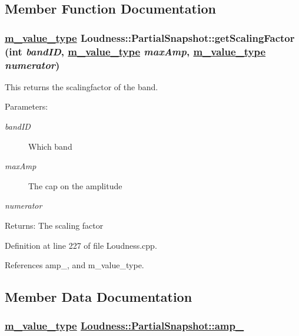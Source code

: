\subsection{Member Function Documentation}
\hypertarget{classLoudness_1_1PartialSnapshot_a1}{
\subsubsection[getScalingFactor]{\setlength{\rightskip}{0pt plus 5cm}\hyperlink{Types_8h_a3}{m\_\-value\_\-type} Loudness::Partial\-Snapshot::get\-Scaling\-Factor (int {\em band\-ID}, \hyperlink{Types_8h_a3}{m\_\-value\_\-type} {\em max\-Amp}, \hyperlink{Types_8h_a3}{m\_\-value\_\-type} {\em numerator})}}
\label{classLoudness_1_1PartialSnapshot_a1}


This returns the scalingfactor of the band. \begin{Desc}
\item[Parameters:]
\begin{description}
\item[{\em band\-ID}]Which band \item[{\em max\-Amp}]The cap on the amplitude \item[{\em numerator}]\end{description}
\end{Desc}
\begin{Desc}
\item[Returns:]The scaling factor \end{Desc}


Definition at line 227 of file Loudness.cpp.

References amp\_\-, and m\_\-value\_\-type.

\subsection{Member Data Documentation}
\hypertarget{classLoudness_1_1PartialSnapshot_o2}{
\subsubsection[amp\_\-]{\setlength{\rightskip}{0pt plus 5cm}\hyperlink{Types_8h_a3}{m\_\-value\_\-type} \hyperlink{classLoudness_1_1PartialSnapshot_o2}{Loudness::Partial\-Snapshot::amp\_\-}}}
\label{classLoudness_1_1PartialSnapshot_o2}


